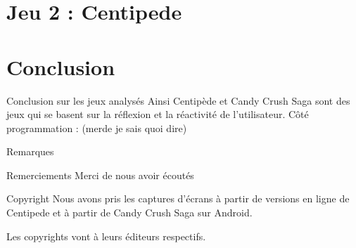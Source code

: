\documentclass{beamer}
\begin{document}
\section{Jeu 2 : Centipede}


\section{Conclusion}
\begin{frame}{Conclusion sur les jeux analysés}
	Ainsi Centipède et Candy Crush Saga sont des jeux qui se basent sur la réflexion et la réactivité de l'utilisateur.
	Côté programmation :  (merde je sais quoi dire)
\end{frame}
\begin{frame}{Remarques}
	\begin{block}{Remerciements}
		Merci de nous avoir écoutés
	\end{block}
	\begin{block}{Copyright}
		Nous avons pris les captures d'écrans à partir de versions en ligne de Centipede et à partir de Candy Crush Saga sur Android.

Les copyrights vont à leurs éditeurs respectifs.
	\end{block}
\end{frame}
\end{document}
